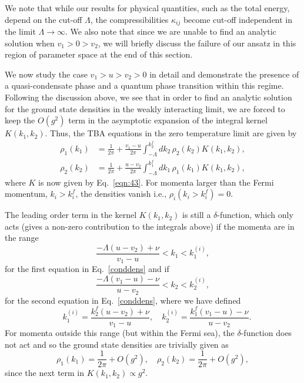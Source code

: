 \documentclass[aps,pra,
superscriptaddress,
reprint,twocolumn,preprintnumbers,
amsmath,amssymb,
nofootinbib]{revtex4-1}
\begin{document}
We note that while our results for physical quantities, such as the total energy, depend on the cut-off $\Lambda$, the compressibilities $\kappa_{ij}$ become cut-off independent in the limit $\Lambda\to\infty$. We also note that since we are unable to find an analytic solution when $v_1>0>v_2$, we will briefly discuss the failure of our ansatz in this region of parameter space at the end of this section.
        
We now study the case $v_1>u>v_2>0$ in detail and demonstrate the presence of a quasi-condensate phase and a quantum phase transition within this regime. Following the discussion above, we see that in order to find an analytic solution for the ground state densities in the weakly interacting limit, we are forced to keep the $O(g^2)$ term in the asymptotic expansion of the integral kernel $K(k_1,k_2)$. Thus, the TBA equations in the zero temperature limit are given by   
		\begin{align}
		\label{conddens}
        \rho_1(k_1) & = \frac{1}{2\pi} + \frac{v_1-u}{2 \pi} \int_{-\Lambda}^{k_2^f}dk_2\,\rho_2(k_2)K(k_1,k_2), \nonumber \\
        \rho_2(k_2) & = \frac{1}{2\pi} + \frac{u - v_2}{2 \pi} \int_{-\Lambda}^{k_1^f}dk_1\,\rho_1(k_1)K(k_1,k_2),
        \end{align}      
where $K$ is now given by Eq.~\eqref{eqn:43}. For momenta larger than the Fermi momentum, $k_i > k_i^f$, the densities vanish i.e., $\rho_i(k_i > k_i^f) =0$. 

The leading order term in the kernel $K(k_1,k_2)$ is still a $\delta$-function, which only acts (gives a non-zero contribution to the integrals above) if the momenta are in the range
        \begin{equation}
        \label{range1}
        \frac{-\Lambda(u - v_2) + \nu}{ v_1-u}<k_1<k_1^{(i)} ,
        \end{equation}
        for the first equation in Eq.~\eqref{conddens} and if
        \begin{equation}
        \label{range22}
        \frac{-\Lambda ( v_1-u) - \nu}{u - v_2}<k_2<k_2^{(i)} ,
        \end{equation}
for the second equation in Eq.~\eqref{conddens},
where we have defined 
		\begin{equation}
		\label{kint}
		\quad k_1^{(i)} = \frac{k_2^f (u - v_2) + \nu}{v_1-u},\quad k_2^{(i)} = \frac{k_1^f ( v_1-u) - \nu}{u - v_2}.
		\end{equation}		
For momenta outside this range (but within the Fermi sea), the $\delta$-function does not act and so the ground state densities are trivially given as 
		\begin{equation}
		\rho_1(k_1) = \frac{1}{2\pi} + O(g^2), \quad \rho_2(k_2) = \frac{1}{2\pi} + O(g^2),
		\end{equation}				
since the next term in $K(k_1,k_2) \propto g^2$. 		      
\end{document}
